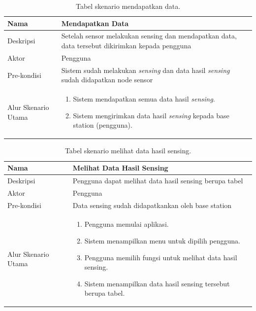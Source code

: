 \documentclass[a4paper,twoside]{article}
\begin{document}
\begin{enumerate}
\begin{table}[H]
    \centering
    \begin{tabular}{|p{3cm}|p{10cm}|}
    \hline
        Nama & Mendapatkan Data\\
    \hline
    \hline
        Deskripsi & Setelah sensor melakukan sensing dan mendapatkan data, data tersebut dikirimkan kepada pengguna\\
    \hline
        Aktor & Pengguna \\
    \hline
        Pre-kondisi & Sistem sudah melakukan \textit{sensing} dan data hasil \textit{sensing} sudah didapatkan node sensor \\
    \hline
        Alur Skenario Utama & 
        \begin{enumerate}
            \item Sistem mendapatkan semua data hasil \textit{sensing}.
            \item Sistem mengirimkan data hasil \textit{sensing} kepada base station (pengguna).
        \end{enumerate}\\
    \hline
    \end{tabular}
    \caption{Tabel skenario mendapatkan data.}
    \label{tab:skenario3}
\end{table}

\begin{table}[H]
    \centering
    \begin{tabular}{|p{3cm}|p{10cm}|}
    \hline
        Nama & Melihat Data Hasil Sensing\\
    \hline
    \hline
        Deskripsi & Pengguna dapat melihat data hasil sensing berupa tabel\\
    \hline
        Aktor & Pengguna \\
    \hline
        Pre-kondisi & Data sensing sudah didapatkankan oleh base station \\
    \hline
        Alur Skenario Utama & 
        \begin{enumerate}
        	\item Pengguna memulai aplikasi.
        	\item Sistem menampilkan menu untuk dipilih pengguna.
        	\item Pengguna memilih fungsi untuk melihat data hasil sensing.
            \item Sistem menampilkan data hasil sensing tersebut berupa tabel.
        \end{enumerate}\\
    \hline
    \end{tabular}
    \caption{Tabel skenario melihat data hasil sensing.}
    \label{tab:skenario4}
\end{table}


\end{enumerate}
\end{document}
